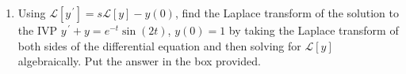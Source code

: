 \documentclass{ximera}
\newcommand{\Laplace}[1]{\ensuremath{\mathcal{L}{\left[#1\right]}}}
\begin{document}
\begin{enumerate}
\hfill{}\fbox{ \begin{minipage}{5in}\vspace{0.75in} \hfill\vspace{0.75in} \end{minipage} }

\newpage


\item Using $\Laplace{y^{\,\prime}}=s\Laplace{y}-y(0)$, find the Laplace transform of the solution to the IVP $y^{\,\prime}+y=e^{-t}\sin{(2t)}$, $y(0)=1$ by taking the Laplace transform of both sides of the differential equation and then solving for $\Laplace{y}$ algebraically.  Put the answer in the box provided.

\hfill{}\fbox{ \begin{minipage}{3in}\vspace{0.25in} \hfill\vspace{0.25in} \end{minipage} }





\end{enumerate}
\end{document}
